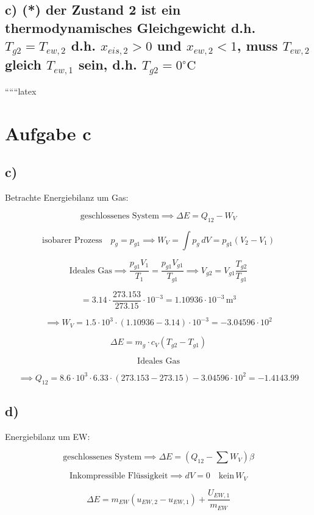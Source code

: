 \subsection*{c) (*) der Zustand 2 ist ein thermodynamisches Gleichgewicht d.h. $T_{g2} = T_{ew,2}$ d.h. $x_{eis,2} > 0$ und $x_{ew,2} < 1$, muss $T_{ew,2}$ gleich $T_{ew,1}$ sein, d.h. $T_{g2} = 0^\circ \text{C}$}

``````latex


\section*{Aufgabe c}

\subsection*{c)}

Betrachte Energiebilanz um Gas:

\[
\text{geschlossenes System} \implies \Delta E = Q_{12} - W_V
\]

\[
\text{isobarer Prozess} \quad p_g = p_{g1} \implies W_V = \int p_g \, dV = p_{g1} (V_2 - V_1)
\]

\[
\text{Ideales Gas} \implies \frac{p_{g1} V_1}{T_1} = \frac{p_{g1} V_{g1}}{T_{g1}} \implies V_{g2} = V_{g1} \frac{T_{g2}}{T_{g1}}
\]

\[
= 3.14 \cdot \frac{273.153}{273.15} \cdot 10^{-3} = 1.10936 \cdot 10^{-3} \, \text{m}^3
\]

\[
\implies W_V = 1.5 \cdot 10^3 \cdot (1.10936 - 3.14) \cdot 10^{-3} = -3.04596 \cdot 10^2
\]

\[
\Delta E = m_g \cdot c_V (T_{g2} - T_{g1})
\]

\[
\text{Ideales Gas}
\]

\[
\implies Q_{12} = 8.6 \cdot 10^3 \cdot 6.33 \cdot (273.153 - 273.15) - 3.04596 \cdot 10^2 = -1.4143.99
\]

\subsection*{d)}

Energiebilanz um EW:

\[
\text{geschlossenes System} \implies \Delta E = \left( Q_{12} - \sum W_V \right) \beta
\]

\[
\text{Inkompressible Flüssigkeit} \implies dV = 0 \quad \text{kein} \, W_V
\]

\[
\Delta E = m_{EW} (u_{EW,2} - u_{EW,1}) + \frac{U_{EW,1}}{m_{EW}}
\]

